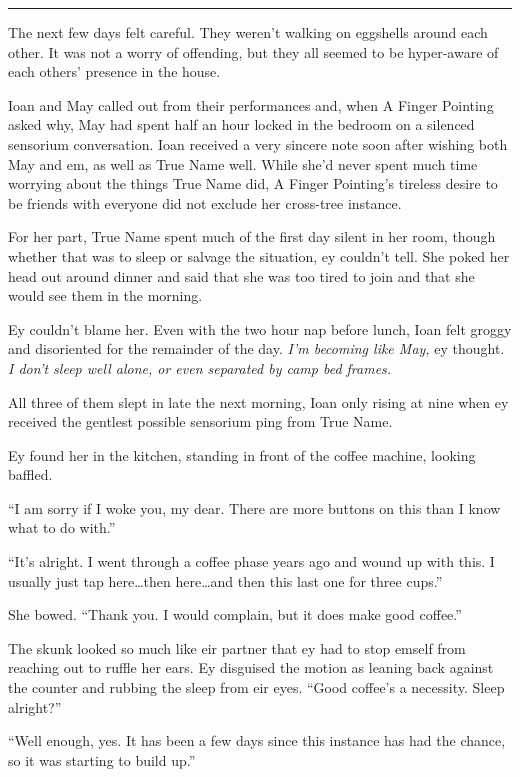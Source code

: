 \begin{center}\rule{0.5\linewidth}{0.5pt}\end{center}

The next few days felt careful. They weren't walking on eggshells around each other. It was not a worry of offending, but they all seemed to be hyper-aware of each others' presence in the house.

Ioan and May called out from their performances and, when A Finger Pointing asked why, May had spent half an hour locked in the bedroom on a silenced sensorium conversation. Ioan received a very sincere note soon after wishing both May and em, as well as True Name well. While she'd never spent much time worrying about the things True Name did, A Finger Pointing's tireless desire to be friends with everyone did not exclude her cross-tree instance.

For her part, True Name spent much of the first day silent in her room, though whether that was to sleep or salvage the situation, ey couldn't tell. She poked her head out around dinner and said that she was too tired to join and that she would see them in the morning.

Ey couldn't blame her. Even with the two hour nap before lunch, Ioan felt groggy and disoriented for the remainder of the day. \emph{I'm becoming like May,} ey thought. \emph{I don't sleep well alone, or even separated by camp bed frames.}

All three of them slept in late the next morning, Ioan only rising at nine when ey received the gentlest possible sensorium ping from True Name.

Ey found her in the kitchen, standing in front of the coffee machine, looking baffled.

``I am sorry if I woke you, my dear. There are more buttons on this than I know what to do with.''

``It's alright. I went through a coffee phase years ago and wound up with this. I usually just tap here\ldots then here\ldots and then this last one for three cups.''

She bowed. ``Thank you. I would complain, but it does make good coffee.''

The skunk looked so much like eir partner that ey had to stop emself from reaching out to ruffle her ears. Ey disguised the motion as leaning back against the counter and rubbing the sleep from eir eyes. ``Good coffee's a necessity. Sleep alright?''

``Well enough, yes. It has been a few days since this instance has had the chance, so it was starting to build up.''

